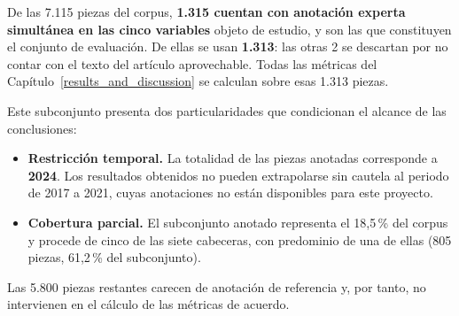 De las 7.115 piezas del corpus, \textbf{1.315 cuentan con anotación experta
simultánea en las cinco variables} objeto de estudio, y son las que constituyen
el conjunto de evaluación. De ellas se usan \textbf{1.313}: las otras 2 se
descartan por no contar con el texto del artículo aprovechable. Todas las métricas
del Capítulo~\ref{results_and_discussion} se calculan sobre esas 1.313 piezas.



Este subconjunto presenta dos particularidades que condicionan el alcance de las
conclusiones:

\begin{itemize}
    \item \textbf{Restricción temporal.} La totalidad de las piezas anotadas
    corresponde a \textbf{2024}. Los resultados obtenidos no pueden extrapolarse
    sin cautela al periodo de 2017 a 2021, cuyas anotaciones no están disponibles para este proyecto.

    \item \textbf{Cobertura parcial.} El subconjunto anotado representa el
    18,5\,\% del corpus y procede de cinco de las siete cabeceras, con
    predominio de una de ellas (805 piezas, 61,2\,\% del subconjunto).
\end{itemize}

Las 5.800 piezas restantes carecen de anotación de referencia y, por tanto, no
intervienen en el cálculo de las métricas de acuerdo.

